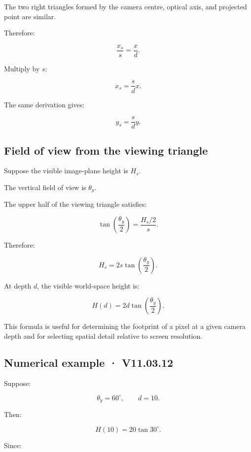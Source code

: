 The two right triangles formed by the camera centre, optical axis, and projected point are similar.

Therefore:

\[
 \frac{x_s}{s}=\frac{x}{d}.
\]

Multiply by \(s\):

\[
 \boxed{ x_s=\frac{s}{d}x }.
\]

The same derivation gives:

\[
 \boxed{ y_s=\frac{s}{d}y }.
\]

\subsection{Field of view from the viewing triangle}\label{02-foundations-ii-ch033-field-of-view-from-the-viewing-triangle}

\hypertarget{02-foundations-ii-ch033-field-of-view-from-the-viewing-triangle}{}

Suppose the visible image-plane height is \(H_s\).

The vertical field of view is \(\theta_y\).

The upper half of the viewing triangle satisfies:

\[
 \tan\left(\frac{\theta_y}{2}\right) = \frac{H_s/2}{s}.
\]

Therefore:

\[
 \boxed{ H_s=2s\tan\left(\frac{\theta_y}{2}\right) }.
\]

At depth \(d\), the visible world-space height is:

\[
 \boxed{ H(d)=2d\tan\left(\frac{\theta_y}{2}\right) }.
\]

This formula is useful for determining the footprint of a pixel at a given camera depth and for selecting spatial detail relative to screen resolution.

\subsection{Numerical example · V11.03.12}\label{02-foundations-ii-ch033-numerical-example-v11.03.12}

\hypertarget{02-foundations-ii-ch033-numerical-example-v11.03.12}{}

Suppose:

\[
 \theta_y=60^\circ, \qquad d=10.
\]

Then:

\[
 H(10)=20\tan30^\circ.
\]

Since:

